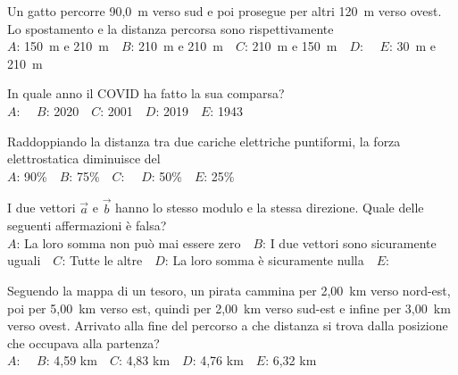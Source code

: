 \mcquestionfooter



\mcpaperfooter

\def\mcserialnumber{34}
\mcpaperheader


\def\mcquestionnumber{1}


\mcquestionheader Un gatto percorre 90,0~m verso sud e poi prosegue per altri 120~m verso ovest. Lo spostamento e la distanza percorsa sono rispettivamente\\
{$A$}: 150~m e 210~m\ \ {$B$}: 210~m e 210~m\ \ {$C$}: 210~m e 150~m\ \ {$D$}: \ \ {$E$}: 30~m e 210~m\ \ 

\mcquestionfooter



\def\mcquestionnumber{2}


\mcquestionheader In quale anno il COVID ha fatto la sua comparsa?\\
{$A$}: \ \ {$B$}: 2020\ \ {$C$}: 2001\ \ {$D$}: 2019\ \ {$E$}: 1943\ \ 

\mcquestionfooter



\def\mcquestionnumber{3}


\mcquestionheader Raddoppiando la distanza tra due cariche elettriche puntiformi, la forza elettrostatica diminuisce del\\
{$A$}: 90\%\ \ {$B$}: 75\%\ \ {$C$}: \ \ {$D$}: 50\%\ \ {$E$}: 25\%\ \ 

\mcquestionfooter



\def\mcquestionnumber{4}


\mcquestionheader I due vettori $\vec{a}$ e $\vec{b}$ hanno lo stesso modulo e la stessa direzione. Quale delle seguenti affermazioni è falsa?\\
{$A$}: La loro somma non può mai essere zero\ \ {$B$}: I due vettori sono sicuramente uguali\ \ {$C$}: Tutte le altre\ \ {$D$}: La loro somma è sicuramente nulla\ \ {$E$}: \ \ 

\mcquestionfooter



\def\mcquestionnumber{5}


\mcquestionheader Seguendo la mappa di un tesoro, un pirata cammina per 2,00~km verso nord-est, poi per 5,00~km verso est, quindi per 2,00~km verso sud-est e infine per 3,00~km verso ovest. Arrivato alla fine del percorso a che distanza si trova dalla posizione che occupava alla partenza?\\
{$A$}: \ \ {$B$}: 4,59 km\ \ {$C$}: 4,83 km\ \ {$D$}: 4,76 km\ \ {$E$}: 6,32 km\ \ 

